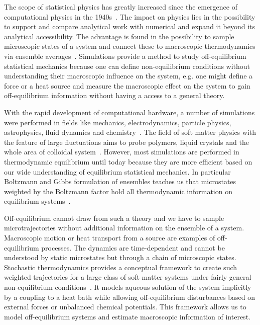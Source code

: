 The scope of statistical physics has greatly increased since the emergence of computational physics in the 1940s~\cite{metropolis1953equation,alder1959studies}. The impact on physics lies in the possibility to support and compare analytical work with numerical and expand it beyond its analytical accessibility. The advantage is found in the possibility to sample microscopic states of a system and connect these to macroscopic thermodynamics via ensemble averages~\cite{frenkel2001understanding}. Simulations provide a method to study off-equilibrium statistical mechanics because one can define non-equilibrium conditions without understanding their macroscopic influence on the system, e.g. one might define a force or a heat source and measure the macroscopic effect on the system to gain off-equilibrium information without having a access to a general theory. 

With the rapid development of computational hardware, a number of simulations were performed in fields like mechanics, electrodynamics, particle physics, astrophysics, fluid dynamics and chemistry~\cite{heermann1990computer}. The field of soft matter physics with the feature of large fluctuations aims to probe polymers, liquid crystals and the whole area of colloidal system~\cite{holm2008advanced}. However, most simulations are performed in thermodynamic equilibrium until today because they are more efficient based on our wide understanding of equilibrium statistical mechanics. In particular  Boltzmann and Gibbs formulation of ensembles teaches us that microstates weighted by the Boltzmann factor hold all thermodynamic information on equilibrium systems~\cite{gibbs1902elementary}. 

Off-equilibrium cannot draw from such a theory and we have to sample microtrajectories without additional information on the ensemble of a system. Macroscopic motion or heat transport from a source are examples of off-equilibrium processes. The dynamics are time-dependent and cannot be understood by static microstates but through a chain of microscopic states. Stochastic thermodynamics provides a conceptual framework to create such weighted trajectories for a large class of soft matter systems under fairly general non-equilibrium conditions~\cite{seifert2012stochastic}. It models aqueous solution of the system implicitly by a coupling to a heat bath while allowing off-equilibrium disturbances based on external forces or unbalanced chemical potentials. This framework allows us to model off-equilibrium systems and estimate macroscopic information of interest. 

